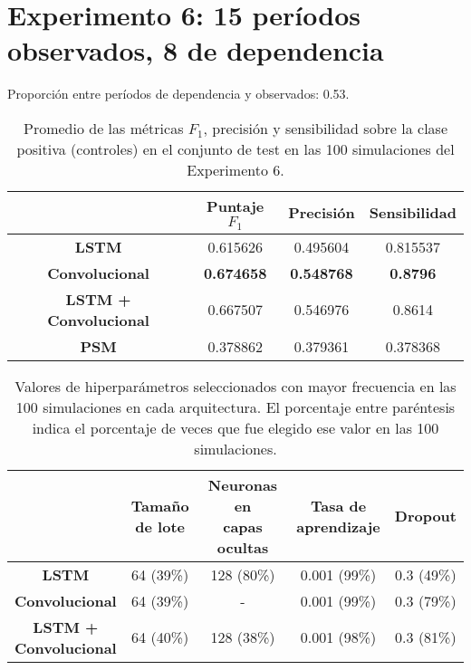 \documentclass[../../main.tex]{subfiles}
\begin{document}
\section{Experimento 6: 15 períodos observados, 8 de dependencia}
Proporción entre períodos de dependencia y observados: 0.53.

\begin{table}[H]
    \centering
    \renewcommand{\arraystretch}{1.2}
    \begin{tabular}{|c|c|c|c|}
        \hline
         & \textbf{Puntaje} \(F_1\) & \textbf{Precisión} & \textbf{Sensibilidad} \\ \hline\hline
        \textbf{LSTM}
            & 0.615626 & 0.495604 & 0.815537 \\ \hline
        \textbf{Convolucional}
            & \textbf{0.674658} & \textbf{0.548768} & \textbf{0.8796} \\ \hline
        \textbf{LSTM + Convolucional}
            & 0.667507 & 0.546976 & 0.8614 \\ \hline
        \textbf{PSM}
            & 0.378862 & 0.379361 & 0.378368 \\
        \hline
    \end{tabular}
    \caption{Promedio de las métricas \(F_1\), precisión y sensibilidad sobre la
    clase positiva (controles) en el conjunto de test en las 100 simulaciones del
    Experimento 6.}
    \label{tab:results_exp6}
\end{table}

\begin{table}[H]
    \centering
    \renewcommand{\arraystretch}{1.2}
    \begin{tabular}{|c|c|c|c|c|}
        \hline
            & \makecell{\textbf{Tamaño}\\\textbf{de lote}}
            & \makecell{\textbf{Neuronas en}\\\textbf{capas ocultas}}
            & \makecell{\textbf{Tasa de}\\\textbf{aprendizaje}}
            & \textbf{Dropout} \\ \hline\hline
        \textbf{LSTM}
            & 64 (39\%) & 128 (80\%) & 0.001 (99\%) & 0.3 (49\%) \\ \hline
        \textbf{Convolucional}
            & 64 (39\%) & -          & 0.001 (99\%) & 0.3 (79\%) \\ \hline
        \makecell{\textbf{LSTM +}\\\textbf{Convolucional}}
            & 64 (40\%) & 128 (38\%) & 0.001 (98\%) & 0.3 (81\%) \\
        \hline
    \end{tabular}
    \caption{Valores de hiperparámetros seleccionados con mayor frecuencia en las 100
    simulaciones en cada arquitectura. El porcentaje entre paréntesis indica el porcentaje
    de veces que fue elegido ese valor en las 100 simulaciones.}
    \label{tab:hyperparams_exp6}
\end{table}
\end{document}
